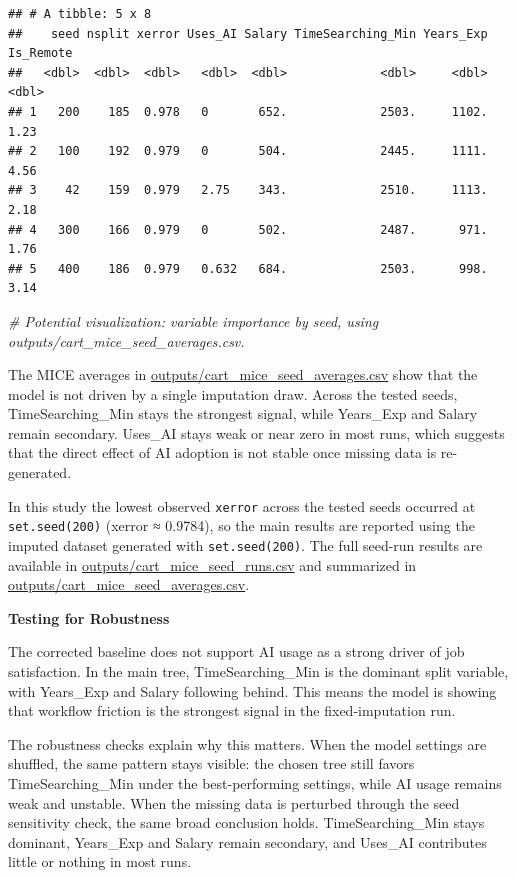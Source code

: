 \documentclass[
]{article}
\newenvironment{Shaded}{\begin{snugshade}}{\end{snugshade}}
\newcommand{\CommentTok}[1]{\textcolor[rgb]{0.56,0.35,0.01}{\textit{#1}}}
\begin{document}
\begin{verbatim}
## # A tibble: 5 x 8
##    seed nsplit xerror Uses_AI Salary TimeSearching_Min Years_Exp Is_Remote
##   <dbl>  <dbl>  <dbl>   <dbl>  <dbl>             <dbl>     <dbl>     <dbl>
## 1   200    185  0.978   0       652.             2503.     1102.      1.23
## 2   100    192  0.979   0       504.             2445.     1111.      4.56
## 3    42    159  0.979   2.75    343.             2510.     1113.      2.18
## 4   300    166  0.979   0       502.             2487.      971.      1.76
## 5   400    186  0.979   0.632   684.             2503.      998.      3.14
\end{verbatim}

\begin{Shaded}
\begin{Highlighting}[]
\CommentTok{\# Potential visualization: variable importance by seed, using outputs/cart\_mice\_seed\_averages.csv.}
\end{Highlighting}
\end{Shaded}

The MICE averages in \url{outputs/cart_mice_seed_averages.csv} show that
the model is not driven by a single imputation draw. Across the tested
seeds, TimeSearching\_Min stays the strongest signal, while Years\_Exp
and Salary remain secondary. Uses\_AI stays weak or near zero in most
runs, which suggests that the direct effect of AI adoption is not stable
once missing data is re-generated.

In this study the lowest observed \texttt{xerror} across the tested
seeds occurred at \texttt{set.seed(200)} (xerror ≈ 0.9784), so the main
results are reported using the imputed dataset generated with
\texttt{set.seed(200)}. The full seed-run results are available in
\url{outputs/cart_mice_seed_runs.csv} and summarized in
\url{outputs/cart_mice_seed_averages.csv}.

\textbf{Testing for Robustness}

The corrected baseline does not support AI usage as a strong driver of
job satisfaction. In the main tree, TimeSearching\_Min is the dominant
split variable, with Years\_Exp and Salary following behind. This means
the model is showing that workflow friction is the strongest signal in
the fixed-imputation run.

The robustness checks explain why this matters. When the model settings
are shuffled, the same pattern stays visible: the chosen tree still
favors TimeSearching\_Min under the best-performing settings, while AI
usage remains weak and unstable. When the missing data is perturbed
through the seed sensitivity check, the same broad conclusion holds.
TimeSearching\_Min stays dominant, Years\_Exp and Salary remain
secondary, and Uses\_AI contributes little or nothing in most runs.
\end{document}
